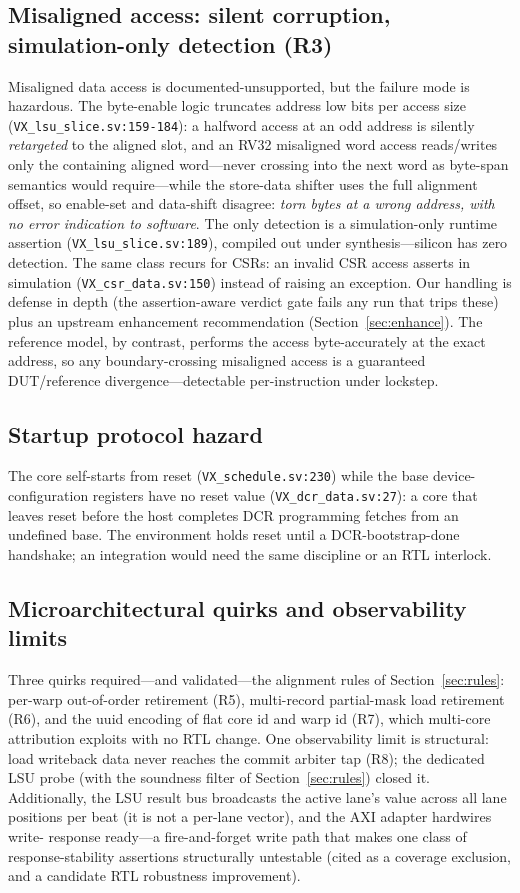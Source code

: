 \documentclass[conference]{IEEEtran}
\newcommand{\code}[1]{\texttt{\small #1}}
\begin{document}
\subsection{Misaligned access: silent corruption, simulation-only
detection (R3)}
Misaligned data access is documented-unsupported, but the failure mode
is hazardous. The byte-enable logic truncates address low bits per
access size (\code{VX\_lsu\_slice.sv:159-184}): a halfword access at an
odd address is silently \emph{retargeted} to the aligned slot, and an
RV32 misaligned word access reads/writes only the containing aligned
word---never crossing into the next word as byte-span semantics would
require---while the store-data shifter uses the full alignment offset,
so enable-set and data-shift disagree: \emph{torn bytes at a wrong
address, with no error indication to software}. The only detection is a
simulation-only runtime assertion (\code{VX\_lsu\_slice.sv:189}),
compiled out under synthesis---silicon has zero detection. The same
class recurs for CSRs: an invalid CSR access asserts in simulation
(\code{VX\_csr\_data.sv:150}) instead of raising an exception. Our
handling is defense in depth (the assertion-aware verdict gate fails
any run that trips these) plus an upstream enhancement recommendation
(Section~\ref{sec:enhance}). The reference model, by contrast, performs
the access byte-accurately at the exact address, so any
boundary-crossing misaligned access is a guaranteed DUT/reference
divergence---detectable per-instruction under lockstep.

\subsection{Startup protocol hazard}
The core self-starts from reset (\code{VX\_schedule.sv:230}) while the
base device-configuration registers have no reset value
(\code{VX\_dcr\_data.sv:27}): a core that leaves reset before the host
completes DCR programming fetches from an undefined base. The
environment holds reset until a DCR-bootstrap-done handshake; an
integration would need the same discipline or an RTL interlock.

\subsection{Microarchitectural quirks and observability limits}
Three quirks required---and validated---the alignment rules of
Section~\ref{sec:rules}: per-warp out-of-order retirement (R5),
multi-record partial-mask load retirement (R6), and the uuid
encoding of flat core id and warp id (R7), which multi-core
attribution exploits with no RTL change. One observability limit is
structural: load writeback data never reaches the commit arbiter tap
(R8); the dedicated LSU probe (with the soundness filter of
Section~\ref{sec:rules}) closed it. Additionally, the LSU result bus
broadcasts the active lane's value across all lane positions per beat
(it is not a per-lane vector), and the AXI adapter hardwires write-%
response ready---a fire-and-forget write path that makes one class of
response-stability assertions structurally untestable (cited as a
coverage exclusion, and a candidate RTL robustness improvement).
\end{document}

